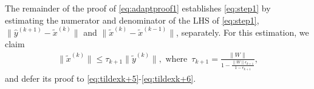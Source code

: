 \documentclass[11pt]{article}
\begin{document}
{{%

{The remainder of the proof of \eqref{eq:adaptproof1} establishes \eqref{eq:step1} by estimating the numerator and denominator of the  LHS of \eqref{eq:step1}, ${\|\widehat{y}^{(k+1)}-\widetilde{x}^{(k)}\|}$ and ${\|\widetilde{x}^{(k)}-\widetilde{x}^{(k-1)}\|}$, separately. For this estimation, we claim 
\begin{align}\label{eq:tildexk+3}
\|\widetilde{x}^{(k)}\|\leq  \tau_{k+1}\|\widetilde{y}^{(k)}\|,\,\,\text{where}\,\,\,\tau_{k+1}=\frac{\|W\|}{1-\frac{\|W\|\epsilon_{k+1}}{1-\epsilon_{k+1}}}, %
\end{align}
and defer its proof to \eqref{eq:tildexk+5}-\eqref{eq:tildexk+6}.


}}}
\end{document}
